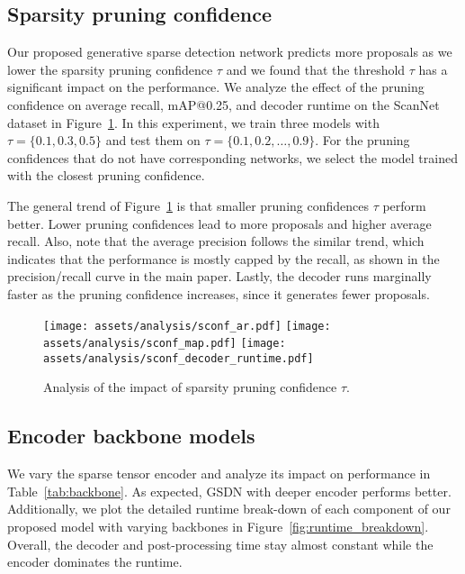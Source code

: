 \documentclass[runningheads]{llncs}
\begin{document}
\subsection{Sparsity pruning confidence}

Our proposed generative sparse detection network predicts more proposals as we lower the sparsity pruning confidence $\tau$ and we found that the threshold $\tau$ has a significant impact on the performance. We analyze the effect of the pruning confidence on average recall, mAP@0.25, and decoder runtime on the ScanNet dataset in Figure~\ref{fig:sparsity_pruning_confidence}. In this experiment, we train three models with $\tau=\{0.1, 0.3, 0.5\}$ and test them on $\tau=\{0.1, 0.2, \ldots, 0.9\}$. For the pruning confidences that do not have corresponding networks, we select the model trained with the closest pruning confidence.

The general trend of Figure~\ref{fig:sparsity_pruning_confidence} is that smaller pruning confidences $\tau$ perform better. Lower pruning confidences lead to more proposals and higher average recall. Also, note that the average precision follows the similar trend, which indicates that the performance is mostly capped by the recall, as shown in the precision/recall curve in the main paper. Lastly, the decoder runs marginally faster as the pruning confidence increases, since it generates fewer proposals.

\begin{figure}
    \centering
    \texttt{[image: assets/analysis/sconf\_ar.pdf]}
    \texttt{[image: assets/analysis/sconf\_map.pdf]}
    \texttt{[image: assets/analysis/sconf\_decoder\_runtime.pdf]}
    \caption{Analysis of the impact of sparsity pruning confidence $\tau$.}
    \label{fig:sparsity_pruning_confidence}
\end{figure}

\subsection{Encoder backbone models}

We vary the sparse tensor encoder and analyze its impact on performance in Table~\ref{tab:backbone}. As expected, GSDN with deeper encoder performs better. Additionally, we plot the detailed runtime break-down of each component of our proposed model with varying backbones in Figure~\ref{fig:runtime_breakdown}. Overall, the decoder and post-processing time stay almost constant while the encoder dominates the runtime.
\end{document}
